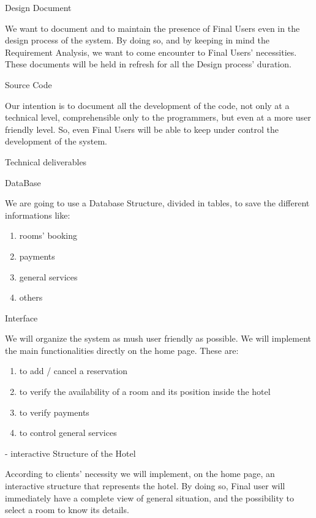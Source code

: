 Design Document
	
	We want to document and to maintain the presence of Final Users even in the design process of the system. By doing so, and by keeping in mind the Requirement Analysis, we want to come encounter to Final Users’ necessities. 
	These documents will be held in refresh for all the Design process’ duration.


Source Code
		
	Our intention is to document all the development of the code, not only at a technical level, comprehensible only to the programmers, but even at a more user friendly level. So, even Final Users will be able to keep under control the development of the system.

	








Technical deliverables

DataBase 
		
	We are going to use a Database Structure, divided in tables, to save the different informations like:
\begin{enumerate}
	\item rooms’ booking 
	\item payments
	\item general services 
	\item others
\end{enumerate}

Interface  
	
	We will organize the system as mush user friendly as possible. We will implement the main functionalities directly on the home page. These are:
\begin{enumerate}
	\item to add / cancel a reservation
	\item to verify the availability of a room and its position inside the hotel
	\item to verify payments
	\item to control general services
\end{enumerate}

 
	- interactive Structure of the Hotel 
	
	According to clients’ necessity we will implement, on the home page, an interactive structure that represents the hotel. By doing so, Final user will immediately have a complete view of general situation, and the possibility to select a room to know its details.



